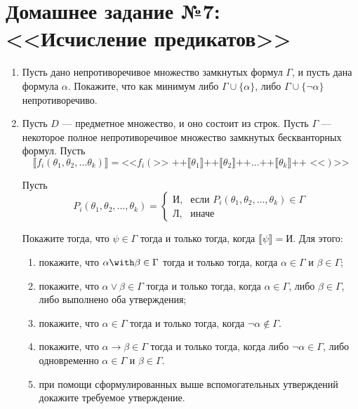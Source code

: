 \documentclass[10pt,a4paper,oneside]{article}
\begin{document}
\begin{enumerate}
\end{enumerate}

\section*{Домашнее задание №7: <<Исчисление предикатов>>}

\begin{enumerate}
\item Пусть дано непротиворечивое множество замкнутых формул $\Gamma$, и пусть
дана формула $\alpha$. Покажите, что как минимум либо $\Gamma \cup \{\alpha\}$, либо
$\Gamma \cup \{\neg\alpha\}$ непротиворечиво.

\item Пусть $D$ --- предметное множество, и оно состоит из строк. Пусть $\Gamma$ --- некоторое
полное непротиворечивое множество замкнутых бескванторных формул.
Пусть $$\llbracket f_i (\theta_1, \theta_2, \dots \theta_k)\rrbracket = 
\textrm{<<}f_i (\textrm{>> ++} \llbracket \theta_1 \rrbracket \textrm{++}
\llbracket \theta_2 \rrbracket \textrm{++} \dots \textrm{++} \llbracket \theta_k \rrbracket 
\textrm{++ <<})\textrm{>>}$$

Пусть $$P_i (\theta_1, \theta_2, \dots, \theta_k) = 
   \left\{ \begin{array}{ll}\texttt{И,}& \textrm{если } P_i (\theta_1, \theta_2, \dots, \theta_k) \in \Gamma\\
           \texttt{Л,} & \textrm{иначе}\end{array}\right.$$

Покажите тогда, что $\psi \in \Gamma$ тогда и только тогда, когда $\llbracket\psi\rrbracket = \texttt{И}$.
Для этого:
\begin{enumerate}
\item покажите, что $\alpha\with\beta \in \Gamma$ тогда и только тогда, когда $\alpha\in\Gamma$ и $\beta\in\Gamma$;
\item покажите, что $\alpha\vee\beta \in \Gamma$ тогда и только тогда, когда $\alpha\in\Gamma$, либо $\beta\in\Gamma$,
либо выполнено оба утверждения;
\item покажите, что $\alpha\in\Gamma$ тогда и только тогда, когда $\neg\alpha\notin\Gamma$.
\item покажите, что $\alpha\rightarrow\beta \in \Gamma$ тогда и только тогда, когда 
либо $\neg\alpha\in\Gamma$, либо одновременно $\alpha\in\Gamma$ и $\beta\in\Gamma$.
\item при помощи сформулированных выше вспомогательных утверждений докажите требуемое утверждение.
\end{enumerate}


\end{enumerate}
\end{document}
